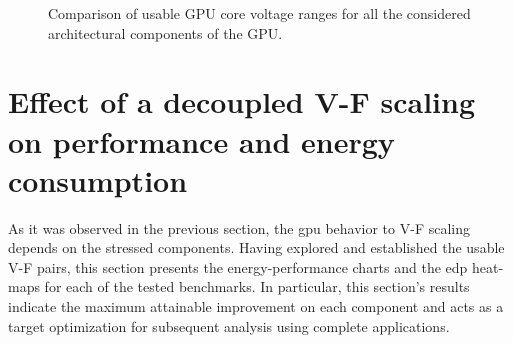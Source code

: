 \begin{figure}
    \centering
    \begin{subfigmatrix}{2}
      \label{fig:Comparison_Guardband}
    \end{subfigmatrix}
    \caption{Comparison of usable GPU core voltage ranges for all the considered architectural components of the GPU.}
\end{figure}

\clearpage


\section{Effect of a decoupled V-F scaling on performance and energy consumption}
\label{sec:gpu_behaviour}


As it was observed in the previous section, the \acrshort{gpu} behavior to V-F scaling depends on the stressed components. Having explored and established the usable V-F  pairs, this section presents the energy-performance charts and the \acrshort{edp} heat-maps for each of the tested benchmarks. In particular, this section's results indicate the maximum attainable improvement on each component and acts as a target optimization for subsequent analysis using complete applications. 



